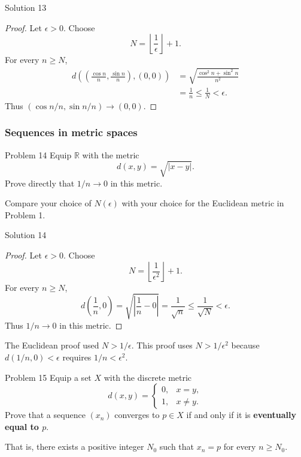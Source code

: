 \documentclass{beamer}
\begin{document}
\begin{frame}{Solution 13}
\begin{proof}
Let $\epsilon>0$. Choose
\[
  N=\left\lfloor\frac{1}{\epsilon}\right\rfloor+1.
\]
For every $n\geq N$,
\[
\begin{aligned}
  d\left(\left(\frac{\cos n}{n},\frac{\sin n}{n}\right),(0,0)\right)
  &=\sqrt{\frac{\cos^2 n+\sin^2 n}{n^2}}\\
  &=\frac{1}{n}\leq\frac{1}{N}<\epsilon.
\end{aligned}
\]
Thus $(\cos n/n,\sin n/n)\to(0,0)$.
\end{proof}
\end{frame}

\subsubsection{Sequences in metric spaces}

\begin{frame}{Problem 14}
Equip $\mathbb R$ with the metric
\[
  d(x,y)=\sqrt{\lvert x-y\rvert}.
\]
Prove directly that $1/n\to0$ in this metric.
\medskip

Compare your choice of $N(\epsilon)$ with your choice for the
Euclidean metric in Problem 1.
\end{frame}

\begin{frame}{Solution 14}
\begin{proof}
Let $\epsilon>0$. Choose
\[
  N=\left\lfloor\frac{1}{\epsilon^2}\right\rfloor+1.
\]
For every $n\geq N$,
\[
  d\left(\frac{1}{n},0\right)
  =\sqrt{\left\lvert\frac{1}{n}-0\right\rvert}
  =\frac{1}{\sqrt{n}}\leq\frac{1}{\sqrt{N}}<\epsilon.
\]
Thus $1/n\to0$ in this metric.
\end{proof}
\medskip

The Euclidean proof used $N>1/\epsilon$. This proof uses
$N>1/\epsilon^2$ because $d(1/n,0)<\epsilon$ requires
$1/n<\epsilon^2$.
\end{frame}

\begin{frame}{Problem 15}
Equip a set $X$ with the discrete metric
\[
  d(x,y)=
  \begin{cases}
    0,&x=y,\\
    1,&x\neq y.
  \end{cases}
\]
Prove that a sequence $(x_n)$ converges to $p\in X$ if and only
if it is \textbf{eventually equal to $p$}.
\medskip

That is, there exists a positive integer $N_0$ such that
$x_n=p$ for every $n\geq N_0$.
\end{frame}
\end{document}
